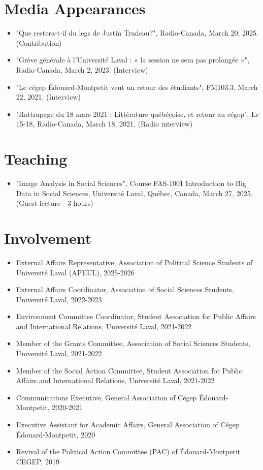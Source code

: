\documentclass[11pt,letterpaper,sans]{moderncv}        %
\begin{document}
\section{Media Appearances}
\begin{itemize}
  \item "Que restera-t-il du legs de Justin Trudeau?", Radio-Canada, March 20, 2025. (Contribution)
  \item "Grève générale à l'Université Laval : « la session ne sera pas prolongée »", Radio-Canada, March 2, 2023. (Interview)
  \item "Le cégep Édouard-Montpetit veut un retour des étudiants", FM103.3, March 22, 2021. (Interview)
  \item "Rattrapage du 18 mars 2021 : Littérature québécoise, et retour au cégep", Le 15-18, Radio-Canada, March 18, 2021. (Radio interview)
\end{itemize}

\section{Teaching}
\begin{itemize}
  \item "Image Analysis in Social Sciences", Course FAS-1001 Introduction to Big Data in Social Sciences, Université Laval, Québec, Canada, March 27, 2025. (Guest lecture - 3 hours)
\end{itemize}

\section{Involvement}
\begin{itemize}
    \item External Affairs Representative, Association of Political Science Students of Université Laval (APEUL), 2025-2026
  \item External Affairs Coordinator, Association of Social Sciences Students, Université Laval, 2022-2023
  \item Environment Committee Coordinator, Student Association for Public Affairs and International Relations, Université Laval, 2021-2022
  \item Member of the Grants Committee, Association of Social Sciences Students, Université Laval, 2021-2022
  \item Member of the Social Action Committee, Student Association for Public Affairs and International Relations, Université Laval, 2021-2022
  \item Communications Executive, General Association of Cégep Édouard-Montpetit, 2020-2021
  \item Executive Assistant for Academic Affairs, General Association of Cégep Édouard-Montpetit, 2020
  \item Revival of the Political Action Committee (PAC) of Édouard-Montpetit CEGEP, 2019
\end{itemize}
\end{document}
